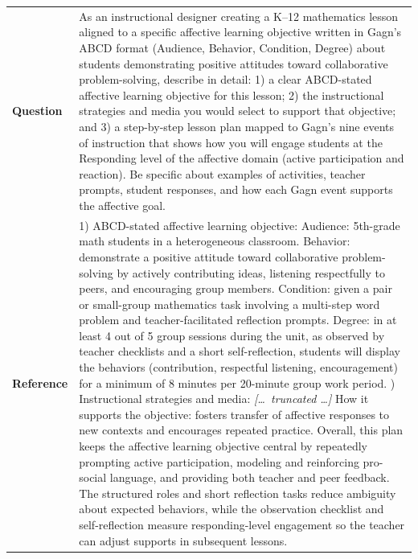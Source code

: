 \begin{longtable}{@{}l p{12.5cm}@{}}
  \textbf{Question} & As an instructional designer creating a K--12 mathematics lesson aligned to a specific affective learning objective written in Gagn's ABCD format (Audience, Behavior, Condition, Degree) about students demonstrating positive attitudes toward collaborative problem-solving, describe in detail: 1) a clear ABCD-stated affective learning objective for this lesson; 2) the instructional strategies and media you would select to support that objective; and 3) a step-by-step lesson plan mapped to Gagn's nine events of instruction that shows how you will engage students at the Responding level of the affective domain (active participation and reaction). Be specific about examples of activities, teacher prompts, student responses, and how each Gagn event supports the affective goal. \\
  \textbf{Reference} & 1) ABCD-stated affective learning objective: \newline Audience: 5th-grade math students in a heterogeneous classroom. \newline Behavior: demonstrate a positive attitude toward collaborative problem-solving by actively contributing ideas, listening respectfully to peers, and encouraging group members. \newline Condition: given a pair or small-group mathematics task involving a multi-step word problem and teacher-facilitated reflection prompts. \newline Degree: in at least 4 out of 5 group sessions during the unit, as observed by teacher checklists and a short self-reflection, students will display the behaviors (contribution, respectful listening, encouragement) for a minimum of 8 minutes per 20-minute group work period. \newline 2) Instructional strategies and media: \newline \textit{[\ldots\ truncated \ldots]} \newline How it supports the objective: fosters transfer of affective responses to new contexts and encourages repeated practice. \newline Overall, this plan keeps the affective learning objective central by repeatedly prompting active participation, modeling and reinforcing pro-social language, and providing both teacher and peer feedback. The structured roles and short reflection tasks reduce ambiguity about expected behaviors, while the observation checklist and self-reflection measure responding-level engagement so the teacher can adjust supports in subsequent lessons. \\

\end{longtable}

